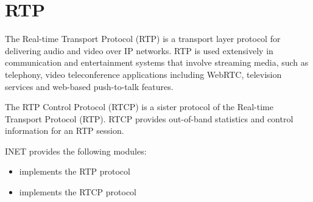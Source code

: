\section{RTP}
\label{sec:transport:rtp}

The Real-time Transport Protocol (RTP) is a transport layer protocol for
delivering audio and video over IP networks. RTP is used extensively in
communication and entertainment systems that involve streaming media, such as
telephony, video teleconference applications including WebRTC, television
services and web-based push-to-talk features.

The RTP Control Protocol (RTCP) is a sister protocol of the Real-time Transport
Protocol (RTP). RTCP provides out-of-band statistics and control information for
an RTP session.

INET provides the following modules:

\begin{itemize}
  \item {} implements the RTP protocol
  \item {} implements the RTCP protocol
\end{itemize}


